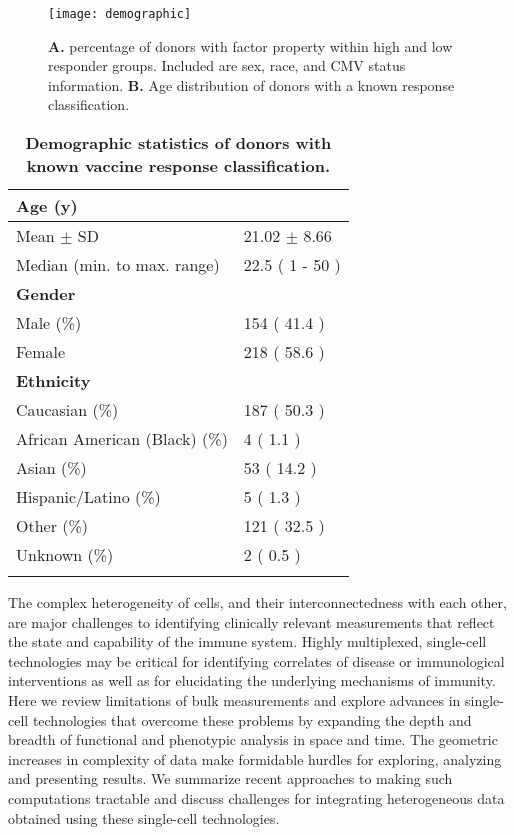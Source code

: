 \begin{figure}
    \texttt{[image: demographic]}
    \label{fig:demoResponder}
    \caption{\textbf{A.} percentage of donors with factor property within high
    and low responder groups. Included are sex, race, and CMV status
    information. \textbf{B.} Age distribution of donors with a known response
    classification.}
\end{figure}

\begin{table}
\centering
\begin{tabular}{ll}
\toprule
\textbf{Age (y)} & \\
\midrule
Mean $\pm$ SD & 21.02 $\pm$ 8.66\\
Median (min. to max. range) & 22.5  ( 1 - 50 )\\
\addlinespace
    \textbf{Gender} & \\
\midrule
Male (\%) & 154 ( 41.4 )\\
Female & 218  ( 58.6 )\\
\addlinespace
    \textbf{Ethnicity} & \\
\midrule
Caucasian (\%) & 187 ( 50.3 )\\
African American (Black) (\%) & 4  ( 1.1 )\\
Asian (\%) & 53  ( 14.2 )\\
Hispanic/Latino (\%) & 5  ( 1.3 )\\
Other (\%) & 121  ( 32.5 )\\
Unknown (\%) & 2  ( 0.5 )\\
\bottomrule{}
\end{tabular}
    \caption{\textbf{Demographic statistics of donors with known vaccine response classification.}}
\end{table}


\citep{chattopadhyaySinglecellTechnologiesMonitoring2014}
The complex heterogeneity of cells, and their interconnectedness with each
other, are major challenges to identifying clinically relevant measurements
that reflect the state and capability of the immune system. Highly multiplexed,
single-cell technologies may be critical for identifying correlates of disease
or immunological interventions as well as for elucidating the underlying
mechanisms of immunity. Here we review limitations of bulk measurements and
explore advances in single-cell technologies that overcome these problems by
expanding the depth and breadth of functional and phenotypic analysis in space
and time. The geometric increases in complexity of data make formidable hurdles
for exploring, analyzing and presenting results. We summarize recent approaches
to making such computations tractable and discuss challenges for integrating
heterogeneous data obtained using these single-cell technologies.

